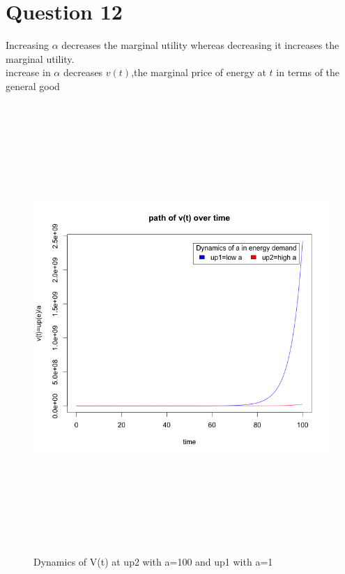 \documentclass[12pt]{article}
\numberwithin{equation}{subsection} %
\begin{document}
\section{Question 12}
Increasing $\alpha$ decreases the marginal utility whereas decreasing it increases the marginal utility.\\
increase in $\alpha$ decreases $v(t)$,the marginal price of energy at $t$ in terms of the general good
\begin{figure}[ht!]
\centering
\includegraphics[width=170mm,height=170mm]{final.png}
\caption{Dynamics of V(t) at up2 with a=100 and up1 with a=1\label{overflow}}
\end{figure}
\newpage
\end{document}
